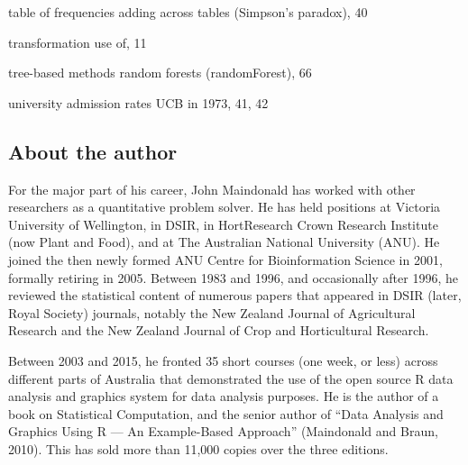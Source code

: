 \documentclass[
  10pt,
  b5paper]{book}
\begin{document}
\begin{theindex}
  \indexspace

  \item table of frequencies
    \subitem adding across tables (Simpson's paradox), 40
  \item transformation
    \subitem use of, 11
  \item tree-based methods
    \subitem random forests (randomForest), 66

  \indexspace

  \item university admission rates
    \subitem UCB in 1973, 41, 42

\end{theindex}

\thispagestyle{empty}

\hypertarget{author}{%
\subsection*{About the author}\label{author}}

For the major part of his career, John Maindonald has worked with other
researchers as a quantitative problem solver.
He has held positions at Victoria University of Wellington, in DSIR, in HortResearch Crown Research Institute (now Plant and Food), and at The Australian National University (ANU).
He joined the then newly formed ANU Centre for Bioinformation Science in 2001, formally retiring in 2005.
Between 1983 and 1996, and occasionally after 1996, he reviewed the statistical content of numerous papers that appeared in DSIR (later, Royal Society) journals, notably the New Zealand Journal of Agricultural Research and the New Zealand Journal of Crop and Horticultural Research.

Between 2003 and 2015, he fronted 35 short courses (one week, or less)
across different parts of Australia that demonstrated the use of the open source R data analysis and graphics system for data analysis purposes.
He is the author of a book on Statistical Computation, and the senior author of ``Data Analysis and Graphics Using R --- An Example-Based Approach'' (Maindonald and Braun, 2010).
This has sold more than 11,000 copies over the three editions.
\end{document}
